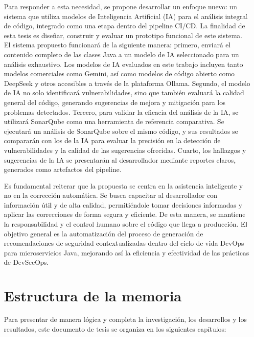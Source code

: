 Para responder a esta necesidad, se propone desarrollar un enfoque nuevo: un sistema que utiliza modelos de Inteligencia Artificial (IA) para el análisis integral de código, integrado como una etapa dentro del pipeline CI/CD. La finalidad de esta tesis es diseñar, construir y evaluar un prototipo funcional de este sistema. El sistema propuesto funcionará de la siguiente manera: primero, enviará el contenido completo de las clases Java a un modelo de IA seleccionado para un análisis exhaustivo. Los modelos de IA evaluados en este trabajo incluyen tanto modelos comerciales como Gemini, así como modelos de código abierto como DeepSeek y otros accesibles a través de la plataforma Ollama. Segundo, el modelo de IA no solo identificará vulnerabilidades, sino que también evaluará la calidad general del código, generando sugerencias de mejora y mitigación para los problemas detectados. Tercero, para validar la eficacia del análisis de la IA, se utilizará SonarQube como una herramienta de referencia comparativa. Se ejecutará un análisis de SonarQube sobre el mismo código, y sus resultados se compararán con los de la IA para evaluar la precisión en la detección de vulnerabilidades y la calidad de las sugerencias ofrecidas. Cuarto, los hallazgos y sugerencias de la IA se presentarán al desarrollador mediante reportes claros, generados como artefactos del pipeline.

Es fundamental reiterar que la propuesta se centra en la asistencia inteligente y no en la corrección automática. Se busca capacitar al desarrollador con información útil y de alta calidad, permitiéndole tomar decisiones informadas y aplicar las correcciones de forma segura y eficiente. De esta manera, se mantiene la responsabilidad y el control humano sobre el código que llega a producción. El objetivo general es la automatización del proceso de generación de recomendaciones de seguridad contextualizadas dentro del ciclo de vida DevOps para microservicios Java, mejorando así la eficiencia y efectividad de las prácticas de DevSecOps.

\section{Estructura de la memoria}\label{sec:estructura}
Para presentar de manera lógica y completa la investigación, los desarrollos y los resultados, este documento de tesis se organiza en los siguientes capítulos:

